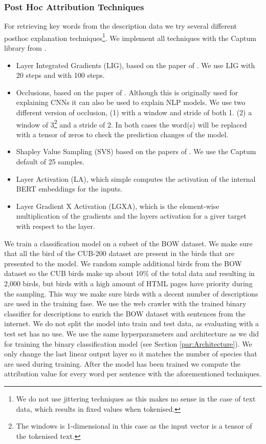 \documentclass[a4paper, 12pt, oneside]{book} %
\begin{document}
\subsubsection{Post Hoc Attribution Techniques} \label{par:attribution}
For retrieving key words from the description data we try several different posthoc explanation techniques\footnote{We do not use jittering techniques as this makes no sense in the case of text data, which results in fixed values when tokenised.}. 
We implement all techniques with the Captum library from \textcite{kokhlikyan_captum_2020}.
\begin{itemize}
    \item Layer Integrated Gradients (LIG), based on the paper of \textcite{sundararajan_axiomatic_2017}. We use LIG with 20 steps and with 100 steps.
    \item Occlusions, based on the paper of \textcite{fleet_visualizing_2014}. Although this is originally used for explaining CNNs it can also be used to explain NLP models. We use two different version of occlusion, (1) with a window and stride of both 1. (2) a window of 3\footnote{The windows is 1-dimensional in this case as the input vector is a tensor of the tokenised text.} and a stride of 2. In both cases the word(s) will be replaced with a tensor of zeros to check the prediction changes of the model. 
    \item Shapley Value Sampling (SVS) based on the papers of \textcite{castro_polynomial_2009, strumbelj_efficient_2010}. We use the Captum default of 25 samples.
    \item Layer Activation (LA), which simple computes the activation of the internal BERT embeddings for the inputs.
    \item Layer Gradient X Activation (LGXA), which is the element-wise multiplication of the gradients and the layers activation for a giver target with respect to the layer.
\end{itemize}

We train a classification model on a subset of the BOW dataset.
We make sure that all the bird of the CUB-200 dataset are present in the birds that are presented to the model.
We random sample additional birds from the BOW dataset so the CUB birds make up about 10\% of the total data and resulting in 2,000 birds, but birds with a high amount of HTML pages have priority during the sampling.
This way we make sure birds with a decent number of descriptions are used in the training fase.
We use the web crawler with the trained binary classifier for descriptions to enrich the BOW dataset with sentences from the internet.
We do not split the model into train and test data, as evaluating with a test set has no use.
We use the same hyperparameters and architecture as we did for training the binary classification model (see Section \ref{par:Architecture}).
We only change the last linear output layer so it matches the number of species that are used during training.
After the model has been trained we compute the attribution value for every word per sentence with the aforementioned techniques.
\end{document}
